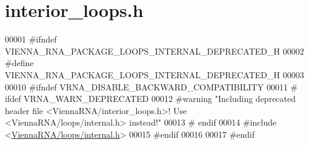 \hypertarget{interior__loops_8h_source}{}\section{interior\+\_\+loops.\+h}
\label{interior__loops_8h_source}

\begin{DoxyCode}
00001 \textcolor{preprocessor}{#ifndef VIENNA\_RNA\_PACKAGE\_LOOPS\_INTERNAL\_DEPRECATED\_H}
00002 \textcolor{preprocessor}{#define VIENNA\_RNA\_PACKAGE\_LOOPS\_INTERNAL\_DEPRECATED\_H}
00003 
00010 \textcolor{preprocessor}{#ifndef VRNA\_DISABLE\_BACKWARD\_COMPATIBILITY}
00011 \textcolor{preprocessor}{# ifdef VRNA\_WARN\_DEPRECATED}
00012 \textcolor{preprocessor}{#warning "Including deprecated header file <ViennaRNA/interior\_loops.h>! Use <ViennaRNA/loops/internal.h>
       instead!"}
00013 \textcolor{preprocessor}{# endif}
00014 \textcolor{preprocessor}{#include <\hyperlink{internal_8h}{ViennaRNA/loops/internal.h}>}
00015 \textcolor{preprocessor}{#endif}
00016 
00017 \textcolor{preprocessor}{#endif}
\end{DoxyCode}
